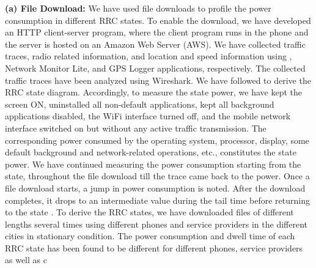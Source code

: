 {\textbf{(a) File Download:}} We have used file downloads to profile the power consumption in different RRC states. To enable the download, we have developed  an HTTP client-server program, where the client program runs in the phone and the server  is hosted on an Amazon Web Server (AWS). We have collected traffic traces, radio related information, and location and speed information using , Network Monitor Lite, and GPS Logger applications, respectively. The collected traffic traces have been analyzed using Wireshark. We have followed \cite{Yang2018} to derive  the RRC state diagram. Accordingly, to measure the  state power, we have kept the screen ON, uninstalled all non-default applications, kept all background applications disabled, the WiFi interface turned off, and the mobile network interface switched on but without any active traffic transmission. The corresponding power consumed by the operating system, processor, display, some default background and network-related operations, etc., constitutes the  state power.  We have continued measuring the power consumption starting from the  state, throughout the file download till the trace came back to the  power. Once a file download starts, a jump in power consumption is noted. After the download completes, it drops to an intermediate value during the tail time before returning to the  state \cite{Yang2018}. To derive the RRC states, we have downloaded files of different lengths several times using different phones and service providers  in the different cities in stationary condition. The power consumption and dwell time of each RRC state has been found to be different for different phones, service providers as well as c


